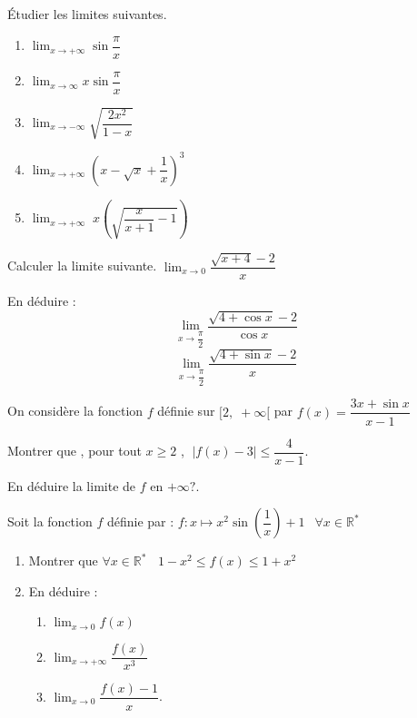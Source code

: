 
\everymath{\displaystyle}


  \summary{}


  \begin{exercice}
      Étudier les limites suivantes.
      \begin{enumerate}
\item  $ \displaystyle \lim_{x \to +\infty}{\sin \dfrac{\pi}{x}}$
 \item $\displaystyle \lim_{x \to \infty}{x\sin \dfrac{\pi}{x}}$
\item $ \displaystyle \lim_{x \to -\infty}{\sqrt{\dfrac{2x^2}{1-x}}}$
\item $ \displaystyle \lim_{x \to+\infty}\left(x-\sqrt{x}+\dfrac{1}{x}\right)^3$
\item $ \displaystyle \lim_{x \to +\infty} \; x\left(\sqrt{\dfrac{x}{x+1}-1}\right)$
 \end{enumerate}
\end{exercice}
  \begin{exercice}
        Calculer la limite suivante.
     $ \displaystyle \lim_{x \to 0} \dfrac{\sqrt{x+4}-2}{x}$ 
     
       En déduire :
        $$ \displaystyle \lim_{x \to \dfrac{\pi}{2}} \dfrac{\sqrt{4+\cos x}-2}{\cos x}$$
       $$ \displaystyle \lim_{x \to \dfrac{\pi}{2}} \dfrac{\sqrt{4+\sin x}-2}{ x}$$
        \end{exercice}
        \begin{exercice}
        On considère la fonction $ f $ définie sur $ [2,\;+\infty[ $ par $ f(x)=\dfrac{3x+\sin x}{x-1} $
        
Montrer que , pour tout $ x\geq 2 $ ,  $ \;\left |f(x) -3\right | \leq \dfrac{4}{x-1}$.

 En déduire la limite de  $ f $ en $ +\infty?.$
\end{exercice}
  \begin{exercice}
 Soit  la fonction $ f $ définie par :  $ f : x\mapsto x^2 \sin\left(\dfrac{1}{x}\right)+1\,\;$ $ \forall x\in\mathbb{R}^{\ast} $
 \begin{enumerate}
\item   Montrer que  $ \forall x\in\mathbb{R}^{\ast} \;\;$  $ 1 -x^2\leq  f(x) \leq  1  +x^2$
\item  En déduire :
\begin{enumerate}
\item $\displaystyle \lim_{x \to 0}{f(x)}$
\item $\displaystyle \lim_{x \to +\infty}{\dfrac{f(x)}{x^3}}$
\item  $ \displaystyle\lim_{x \to 0}{\dfrac{f(x)-1}{x}}$.
 \end{enumerate}
  \end{enumerate}
\end{exercice}
